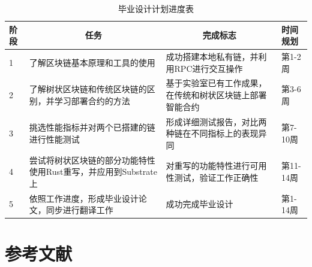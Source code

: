 \documentclass[type=undergraduate_proposal]{bitreport}
\begin{document}
\begin{table}[!ht]
  \centering
  \caption{毕业设计计划进度表}
  \label{tab:progress}
  \begin{tabular}{lp{4cm}p{4cm}p{3cm}}
    \toprule
    阶段 & \multicolumn{1}{c}{任务}      & \multicolumn{1}{c}{完成标志}        & 时间规划    \\ \midrule
    1  & 了解区块链基本原理和工具的使用             & 成功搭建本地私有链，并利用RPC进行交互操作          & 第1-2周   \\ \midrule
    2  & 了解树状区块链和传统区块链的区别，并学习部署合约的方法 & 基于实验室已有工作成果，在传统和树状区块链上部署智能合约    & 第3-6周   \\ \midrule
    3  & 挑选性能指标并对两个已搭建的链进行性能测试       & 形成详细测试报告，对比两种链在不同指标上的表现异同       & 第7-10周  \\ \midrule
    4  & 尝试将树状区块链的部分功能特性使用Rust重写，并应用到Substrate上  & 对重写的功能特性进行可用性测试，验证工作正确性 & 第11-14周 \\ \midrule
    5  & 依照工作进度，形成毕业设计论文，同步进行翻译工作    & 成功完成毕业设计                        & 第1-14周  \\ \bottomrule
  \end{tabular}
\end{table}

\section{参考文献}
\printbibliography[heading=none]
\end{document}
